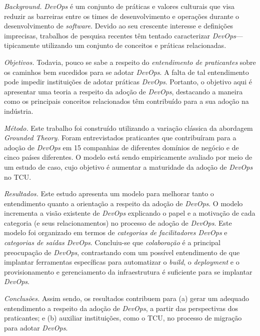\emph{Background.} {\it DevOps} é um conjunto de práticas e valores culturais
que visa reduzir as barreiras entre os times de desenvolvimento e operações
durante o desenvolvimento de {\it software}.
Devido ao seu crescente interesse e definições imprecisas, trabalhos de
pesquisa recentes têm tentado caracterizar {\it DevOps}---tipicamente utilizando
um conjunto de conceitos e práticas relacionadas.

  \emph{Objetivos.} Todavia, pouco se sabe a respeito do \emph{entendimento de
  praticantes} sobre os caminhos bem sucedidos para se adotar {\it DevOps}. A falta
  de tal entendimento pode impedir instituições de adotar práticas {\it DevOps}.
  Portanto, o objetivo aqui é apresentar uma teoria a respeito da adoção de
  {\it DevOps}, destacando a maneira como os principais conceitos relacionados
  têm contribuído para a sua adoção na indústria.

  \emph{Método.} Este trabalho foi construído utilizando a variação clássica da
  abordagem {\it Grounded Theory}. Foram entrevistados praticantes que
  contribuíram para a adoção de {\it DevOps} em 15 companhias de diferentes
  domínios de negócio e de cinco países diferentes. O modelo está sendo empiricamente
  avaliado por meio de um estudo de caso, cujo objetivo é aumentar a maturidade
  da adoção de {\it DevOps} no \acrfull{TCU}.

  \emph{Resultados.} Este estudo apresenta um modelo para melhorar tanto o
  entendimento quanto a orientação a respeito da adoção de {\it DevOps}. O modelo
  incrementa a visão existente de {\it DevOps} explicando o papel e a motivação
  de cada categoria (e seus relacionamentos) no processo de adoção de {\it DevOps}.
  Este modelo foi organizado em termos de \emph{categorias de facilitadores DevOps}
  e \emph{categorias de saídas DevOps}. Concluiu-se que \emph{colaboração} é a
  principal preocupação de {\it DevOps}, contrastando com um possível
  entendimento de que implantar ferramentas específicas para automatizar o
  {\it build}, o {\it deployment} e o provisionamento e gerenciamento da
  infraestrutura é suficiente para se implantar {\it DevOps}.

  \emph{Conclusões.} Assim sendo, os resultados contribuem para (a) gerar um
  adequado entendimento a respeito da adoção de {\it DevOps}, a partir das
  perspectivas dos praticantes; e (b) auxiliar instituições, como o \acrshort{TCU},
  no processo de migração para adotar {\it DevOps}.
